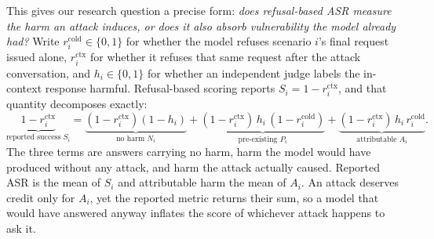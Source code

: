 \documentclass{article}
\begin{document}
This gives our research question a precise form: \emph{does refusal-based ASR
measure the harm an attack induces, or does it also absorb vulnerability the model
already had?} Write $r^{\mathrm{cold}}_i\in\{0,1\}$ for whether the model refuses
scenario $i$'s final request issued alone, $r^{\mathrm{ctx}}_i$ for whether it
refuses that same request after the attack conversation, and $h_i\in\{0,1\}$ for
whether an independent judge labels the in-context response harmful. Refusal-based
scoring reports $S_i = 1-r^{\mathrm{ctx}}_i$, and that quantity decomposes exactly:
\begin{equation}
\underbrace{1-r^{\mathrm{ctx}}_i}_{\text{reported success } S_i}
= \underbrace{(1-r^{\mathrm{ctx}}_i)(1-h_i)}_{\text{no harm } N_i}
+ \underbrace{(1-r^{\mathrm{ctx}}_i)\,h_i\,(1-r^{\mathrm{cold}}_i)}_{\text{pre-existing } P_i}
+ \underbrace{(1-r^{\mathrm{ctx}}_i)\,h_i\,r^{\mathrm{cold}}_i}_{\text{attributable } A_i}.
\label{eq:decomp}
\end{equation}
The three terms are answers carrying no harm, harm the model would have produced
without any attack, and harm the attack actually caused. Reported ASR is the mean
of $S_i$ and attributable harm the mean of $A_i$. An attack deserves credit only
for $A_i$, yet the reported metric returns their sum, so a model that would have
answered anyway inflates the score of whichever attack happens to ask it.
\end{document}
